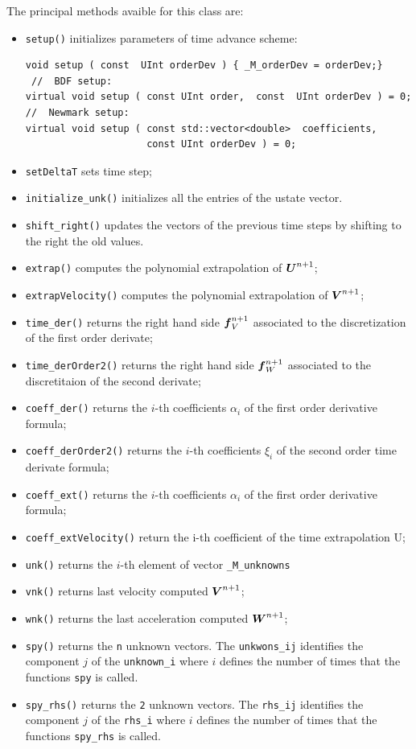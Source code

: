 \documentclass[english,a4paper]{article}
\newcommand{\Ubf}{\text{\mbox{\boldmath $U$}}}
\newcommand{\Abf}{\text{\mbox{\boldmath $W$}}}
\newcommand{\fbf}{\text{\mbox{\boldmath $f$}}}
\newcommand{\Wbf}{\text{\mbox{\boldmath $V$}}}
\begin{document}
  The principal methods  avaible for this class are:
  \begin{itemize}
  \item \verb"setup()" initializes
    parameters of time advance
    scheme:
\begin{verbatim}
void setup ( const  UInt orderDev ) { _M_orderDev = orderDev;} 
 //  BDF setup:
virtual void setup ( const UInt order,  const  UInt orderDev ) = 0;
//  Newmark setup:
virtual void setup ( const std::vector<double>  coefficients, 
                     const UInt orderDev ) = 0;
\end{verbatim}
\item \verb"setDeltaT" sets time step; 
  \item \verb"initialize_unk()" initializes all the entries of the
    ustate vector.
  \item \verb"shift_right()" updates the vectors of the previous time
    steps by shifting to the right  the old values.
  \item \verb"extrap()"  computes the polynomial extrapolation of  $\Ubf^{n+1}$;
  \item \verb"extrapVelocity()"  computes the polynomial extrapolation of $\Wbf^{n+1}$;
  \item \verb"time_der()" returns the right hand side $\fbf_V^{n+1}$
    associated to the discretization of the  first order derivate;
  \item \verb"time_derOrder2()" returns the right hand side $\fbf_W^{n+1}$ associated to the discretitaion of  the second derivate;
  \item \verb"coeff_der()" returns the $i$-th coefficients $\alpha_i$
    of the first order derivative
    formula;
 \item \verb"coeff_derOrder2()" returns the $i$-th coefficients $\xi_i$ of
    the second order time derivate formula;
  \item \verb"coeff_ext()" returns the $i$-th coefficients $\alpha_i$ of the first order derivative formula;
 \item \verb"coeff_extVelocity()"
   return the i-th coefficient of
   the time extrapolation U;

 \item \verb"unk()" returns the
   $i$-th element of vector
   \verb"_M_unknowns"

 \item \verb"vnk()" returns last
   velocity computed  $\Wbf^{n+1}$;

 \item \verb"wnk()" returns the last
   acceleration computed
   $\Abf^{n+1}$;
\item \verb"spy()" returns the
\verb"n"  unknown vectors. The
\verb"unkwons_ij"
 identifies the component $j$ of the
 \verb"unknown_i" where $i$ defines
 the number of times that the
 functions \verb"spy" is called.
\item \verb"spy_rhs()" returns the
\verb"2"  unknown vectors. The
\verb"rhs_ij"  identifies the component $j$ of the
 \verb"rhs_i" where $i$ defines
 the number of times that the
 functions \verb"spy_rhs" is called.
 \end{itemize} 
\end{document}
